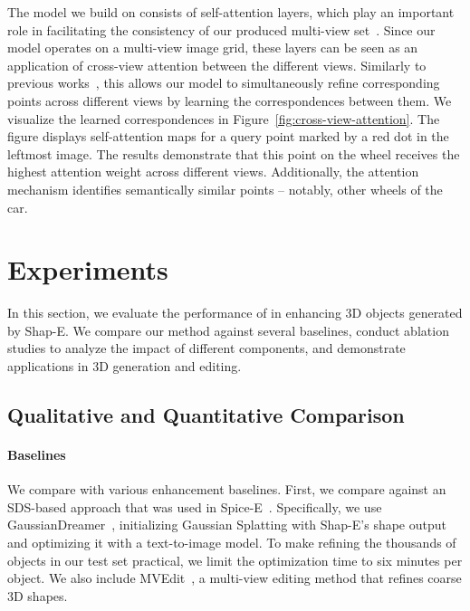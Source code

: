 The model we build on consists of self-attention layers, which play an important role in facilitating the consistency of our produced multi-view set~\cite{shi2024mvdream, wang2023imagedream}. Since our model operates on a multi-view image grid, these layers can be seen as an application of cross-view attention between the different views. Similarly to previous works~\cite{wang2023imagedream, shi2024mvdream, shi2023zero123singleimageconsistent}, this allows our model to simultaneously refine corresponding points across different views by learning the correspondences between them. 
We visualize the learned correspondences in Figure~\ref{fig:cross-view-attention}. The figure displays self-attention maps for a query point marked by a red dot in the leftmost image. The results demonstrate that this point on the wheel receives the highest attention weight across different views. Additionally, the attention mechanism identifies semantically similar points -- notably, other wheels of the car.







\section{Experiments}
In this section, we evaluate the performance of \ourname{} in enhancing 3D objects generated by Shap-E. We compare our method against several baselines, conduct ablation studies to analyze the impact of different components, and demonstrate applications in 3D generation and editing.

\subsection{Qualitative and Quantitative Comparison}


\paragraph{Baselines}

We compare \ourname{} with various enhancement baselines. First, we compare against an SDS-based approach that was used in Spice-E~\cite{sella2024spicee}. Specifically, we use GaussianDreamer~\cite{yi2024gaussiandreamerfastgenerationtext}, initializing Gaussian Splatting with Shap-E's shape output and optimizing it with a text-to-image model. 
To make refining the thousands of objects in our test set practical, we limit the optimization time to six minutes per object.
We also include MVEdit~\cite{mvedit2024}, a multi-view editing method that  refines coarse 3D shapes.

